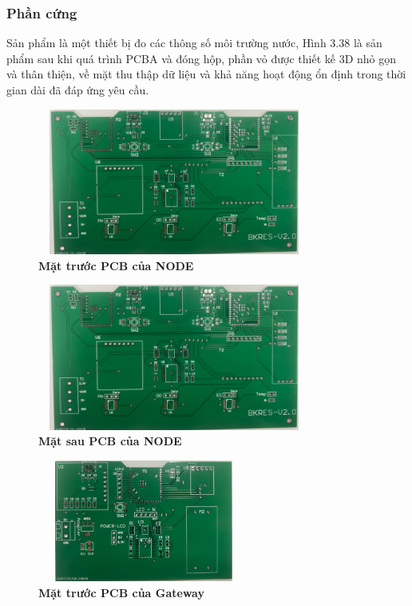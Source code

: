 \documentclass{article} %
\begin{document}
	\subsubsection{Phần cứng}
	Sản phẩm là một thiết bị đo các thông số môi trường nước, Hình 3.38 là sản phẩm sau khi quá trình PCBA và đóng hộp, phần vỏ được thiết kế 3D nhỏ gọn và thân thiện, về mặt thu thập dữ liệu và khả năng hoạt động ổn định trong thời gian dài đã đáp ứng yêu cầu.
	
	\begin{figure}[!ht]
		\centering
		\includegraphics[width=9cm,height=4.8cm]{Images/mtNodetop.png}
		\caption[  Mặt trước PCB của Node ]{\bfseries \fontsize{12pt}{0pt}\selectfont Mặt trước PCB của NODE}
		\label{mtNodetop}
	\end{figure}
	\begin{figure}[!ht]
		\centering
		\includegraphics[width=9cm,height=4.8cm]{Images/mtNodetop.png}
		\caption[  Mặt sau PCB của Node ]{\bfseries \fontsize{12pt}{0pt}\selectfont Mặt sau PCB của NODE}
		\label{NodePCBbot}
	\end{figure}
	\begin{figure}[!ht]
		\centering
		\includegraphics[width=7cm,height=4cm]{Images/mtGatetop.png}
		\caption[  Mặt trước PCB của Gateway ]{\bfseries \fontsize{12pt}{0pt}\selectfont Mặt trước PCB của Gateway}
		\label{mtGatetop}
	\end{figure}
	
\end{document}
